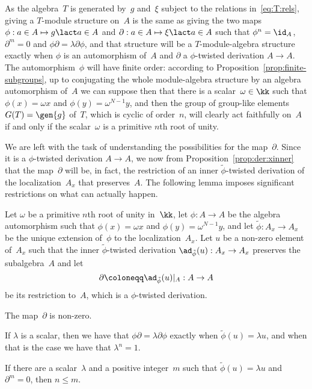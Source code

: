 As the algebra~$T$ is generated by~$g$ and~$\xi$ subject to the
relations in~\eqref{eq:T:rels}, giving a $T$-module structure on~$A$ is the
same as giving the two maps $\phi:a\in A\mapsto g\lact a\in A$ and
$\partial:a\in A\mapsto\xi\lact a\in A$ such that $\phi^n=\id_A$,
$\partial^m=0$ and $\phi\partial=\lambda\partial\phi$, and
that structure will be a $T$-module-algebra structure exactly when $\phi$ is
an automorphism of~$A$ and $\partial$ a $\phi$-twisted derivation $A\to A$.
The automorphism~$\phi$ will have finite order: according to
Proposition~\ref{prop:finite-subgroups}, up to conjugating the whole
module-algebra structure by an algebra automorphism of~$A$ we can suppose
then that there is a scalar~$\omega\in\kk$ such that $\phi(x)=\omega x$ and
$\phi(y)=\omega^{N-1} y$, and then the group of group-like
elements~$G(T)=\gen{g}$ of~$T$, which is cyclic of order~$n$, will clearly
act faithfully on~$A$ if and only if the scalar~$\omega$ is a primitive
$n$th root of unity.

We are left with the task of understanding the possibilities for the
map~$\partial$. Since it is a $\phi$-twisted derivation $A\to A$, we now
from Proposition~\ref{prop:der:xinner} that the map~$\partial$ will be, in
fact, the restriction of an inner $\tilde\phi$-twisted derivation of the
localization~$A_x$ that preserves~$A$. The following lemma imposes
significant restrictions on what can actually happen.

\begin{Lemma}\label{lemma:partial:inner}
Let $\omega$ be a primitive $n$th root of unity in~$\kk$, let $\phi:A\to A$
be the algebra automorphism such that $\phi(x)=\omega x$ and
$\phi(y)=\omega^{N-1}y$, and let $\tilde\phi:A_x\to A_x$ be the unique
extension of~$\phi$ to the localization~$A_x$. Let $u$ be a non-zero
element of~$A_x$ such that the inner $\tilde\phi$-twisted derivation
$\ad_{\tilde\phi}(u):A_x\to A_x$ preserves the subalgebra~$A$ and let
  \[
  \partial\coloneqq\ad_{\tilde\phi}(u)|_A:A\to A
  \]
be its restriction to~$A$, which is a $\phi$-twisted derivation.
\begin{thmlist}

\item The map~$\partial$ is non-zero.

\item If $\lambda$ is a scalar, then we have that
$\phi\partial=\lambda\partial\phi$ exactly when $\tilde\phi(u)=\lambda u$,
and when that is the case we have that $\lambda^n=1$.

\item If there are a scalar~$\lambda$ and a positive integer~$m$
such that $\tilde\phi(u)=\lambda u$ and $\partial^m=0$, then $n\leq m$.

\end{thmlist}
\end{Lemma}

